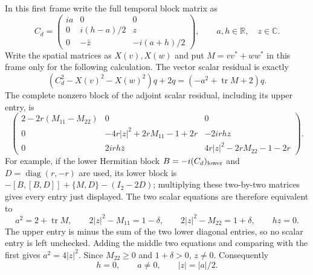 In this first frame write the full temporal block matrix as
\[
C_d=\begin{pmatrix}
ia&0&0\\0&i(h-a)/2&z\\0&-\bar z&-i(a+h)/2
\end{pmatrix},\qquad a,h\in\mathbb R,\quad z\in\mathbb C.
\]
Write the spatial matrices as $X(v),X(w)$ and put
$M=vv^*+ww^*$ in this frame only for the following calculation.
The vector scalar residual is exactly
\[
(C_d^2-X(v)^2-X(w)^2)q+2q
=(-a^2+\operatorname{tr}M+2)q.
\]
The complete nonzero block of the adjoint scalar residual, including
its upper entry, is
\[
\begin{pmatrix}
2-2r(M_{11}-M_{22})&0&0\\
0&-4r|z|^2+2rM_{11}-1+2r&-2irhz\\
0&2irh\bar z&4r|z|^2-2rM_{22}-1-2r
\end{pmatrix}.
\]
For example, if the lower Hermitian block $B=-i(C_d)_{\rm lower}$
and $D=\operatorname{diag}(r,-r)$ are used, its lower block is
$-[B,[B,D]]+\{M,D\}-(I_2-2D)$; multiplying these two-by-two
matrices gives every entry just displayed.
The two scalar equations are therefore equivalent to
\begin{equation}
a^2=2+\operatorname{tr}M,\qquad
2|z|^2-M_{11}=1-\delta,\qquad
2|z|^2-M_{22}=1+\delta,\qquad hz=0.
\label{q444:twocross:eq:first-scalar}
\end{equation}
The upper entry is minus the sum of the two lower diagonal entries,
so no scalar entry is left unchecked. Adding the middle two equations
and comparing with the first gives $a^2=4|z|^2$. Since
$M_{22}\ge0$ and $1+\delta>0$, $z\ne0$. Consequently
\begin{equation}
h=0,\qquad a\ne0,\qquad |z|=|a|/2.
\label{q444:twocross:eq:temporal-forced}
\end{equation}

